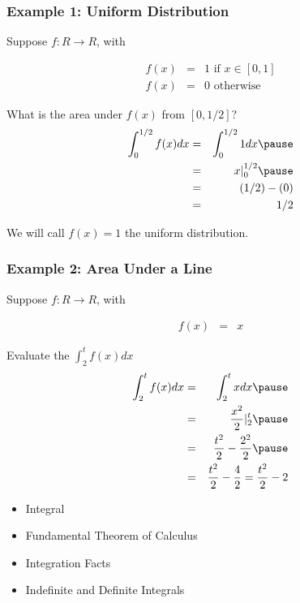 \documentclass{beamer}
\numberwithin{equation}{section}
\begin{document}
\begin{frame}
\frametitle{Example 1: Uniform Distribution}

Suppose $f: R \rightarrow R$, with 

\begin{eqnarray}
f(x) & =&  1 \text{ if  } x \in [0,1] \nonumber \\
f(x) & = & 0 \text{ otherwise } \nonumber
\end{eqnarray}
\pause 

What is the area under $f(x)$ from $[0, 1/2]$? \pause \\
\begin{eqnarray}
\int_{0}^{1/2}  f(x)dx & = & \int_{0}^{1/2} 1 dx \nonumber  \pause \\
							& = & x|_{0}^{1/2} \nonumber  \pause \\
							& = & (1/2) - (0 ) \nonumber \\
							& = & 1/2 \nonumber 
\end{eqnarray}
\pause 

We will call $f(x) = 1$ the uniform distribution.   

\end{frame}

\begin{frame}
\frametitle{Example 2: Area Under a Line} 

Suppose $f: R \rightarrow R$, with 

\begin{eqnarray}
f(x) & = & x \nonumber 
\end{eqnarray}

\pause 

Evaluate the $\int_{2}^{t}f(x)dx$  \pause 
\begin{eqnarray}
\int_{2}^{t}f(x)dx & = & \int_{2}^{t} x dx \nonumber  \pause \\
						& = & \frac{x^{2} }{2} |_{2}^{t} \nonumber  \pause  \\
						& = & \frac{t^2}{2} - \frac{2^2}{2} \nonumber  \pause \\
						& = & \frac{t^2}{2} - \frac{4}{2} = \frac{t^2}{2} - 2 \nonumber 
\end{eqnarray}						

\end{frame}



\begin{frame}

\begin{itemize}
\item \textcolor{mygray}{Integral}
\item \textcolor{mygray}{Fundamental Theorem of Calculus}
\item \textcolor{myblack}{Integration Facts}
\item \textcolor{mygray}{Indefinite and Definite Integrals}
\end{itemize}

\end{frame}
\end{document}

